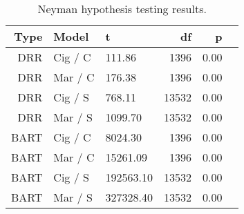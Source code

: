 \begin{table}[ht]
\centering
\begin{tabular}{rllrrr}
  \hline
 Type & Model & t & df & p \\ 
  \hline
 DRR & Cig / C & 111.86 & 1396 & 0.00 \\ 
   DRR & Mar / C & 176.38 & 1396 & 0.00 \\ 
   DRR & Cig / S & 768.11 & 13532 & 0.00 \\ 
   DRR & Mar / S & 1099.70 & 13532 & 0.00 \\ 
   BART & Cig / C & 8024.30 & 1396 & 0.00 \\ 
   BART & Mar / C & 15261.09 & 1396 & 0.00 \\ 
   BART & Cig / S & 192563.10 & 13532 & 0.00 \\ 
   BART & Mar / S & 327328.40 & 13532 & 0.00 \\ 
   \hline
\end{tabular}
\caption{Neyman hypothesis testing results.}
\end{table}
